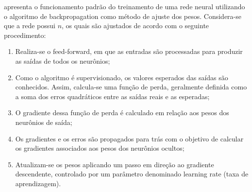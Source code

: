          apresenta o funcionamento padrão do treinamento de uma rede neural utilizando o algoritmo 
        de backpropagation como método de ajuste dos pesos. Considera-se que a rede possui \( n\),  os quais são 
        ajustados de acordo com o seguinte procedimento:
        \begin{enumerate}
            \item Realiza-se o feed-forward, em que as entradas são processadas para produzir as saídas de todos os neurônios;
            \item Como o algoritmo é supervisionado, os valores esperados das saídas são conhecidos. Assim, calcula-se uma função de perda, geralmente definida como a soma dos erros quadráticos entre as saídas reais e as esperadas;
            \item O gradiente dessa função de perda é calculado em relação aos pesos dos neurônios de saída;
            \item Os gradientes e os erros são propagados para trás com o objetivo de calcular os gradientes associados aos pesos dos neurônios ocultos;
            \item Atualizam-se os pesos aplicando um passo em direção ao gradiente descendente, controlado por um parâmetro denominado learning rate (taxa de aprendizagem).
        \end{enumerate}
